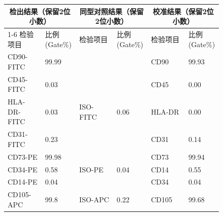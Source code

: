 \documentclass[UTF8,10pt,a4paper,fontset=fandol]{ctexart}
\newcommand{\fieldvalue}[1]{#1}
\newcommand{\handwritten}[1]{#1}
\begin{document}
\small
\begin{tabular}{|p{0.17\linewidth}|p{0.11\linewidth}|p{0.17\linewidth}|p{0.11\linewidth}|p{0.17\linewidth}|p{0.11\linewidth}|}
\hline
\multicolumn{2}{|c|}{检出结果（保留2位小数）} &
\multicolumn{2}{c|}{同型对照结果（保留2位小数）} &
\multicolumn{2}{c|}{校准结果（保留2位小数）} \\
\cline{1-6}
检验项目 & 比例(Gate\%) & 检验项目 & 比例(Gate\%) & 检验项目 & 比例(Gate\%) \\
\hline
CD90-FITC &
\fieldvalue{\handwritten{99.99}} &
& & CD90 &
\fieldvalue{\handwritten{99.93}} \\
\hline
CD45-FITC &
\fieldvalue{\handwritten{0.03}} &
& & CD45 &
\fieldvalue{\handwritten{0.00}} \\
\hline
HLA-DR-FITC &
\fieldvalue{\handwritten{0.03}} &
ISO-FITC &
\fieldvalue{\handwritten{0.06}} &
HLA-DR &
\fieldvalue{\handwritten{0.00}} \\
\hline
CD31-FITC &
\fieldvalue{\handwritten{0.23}} &
& & CD31 &
\fieldvalue{\handwritten{0.14}} \\
\hline
CD73-PE &
\fieldvalue{\handwritten{99.98}} &
& & CD73 &
\fieldvalue{\handwritten{99.94}} \\
\hline
CD34-PE &
\fieldvalue{\handwritten{0.58}} &
ISO-PE &
\fieldvalue{\handwritten{0.04}} &
CD14 &
\fieldvalue{\handwritten{0.55}} \\
\hline
CD14-PE &
\fieldvalue{\handwritten{0.04}} &
& & CD34 &
\fieldvalue{\handwritten{0.04}} \\
\hline
CD105-APC &
\fieldvalue{\handwritten{99.8}} &
ISO-APC &
\fieldvalue{\handwritten{0.22}} &
CD105 &
\fieldvalue{\handwritten{99.68}} \\
\hline
\end{tabular}
\normalsize
\end{document}
